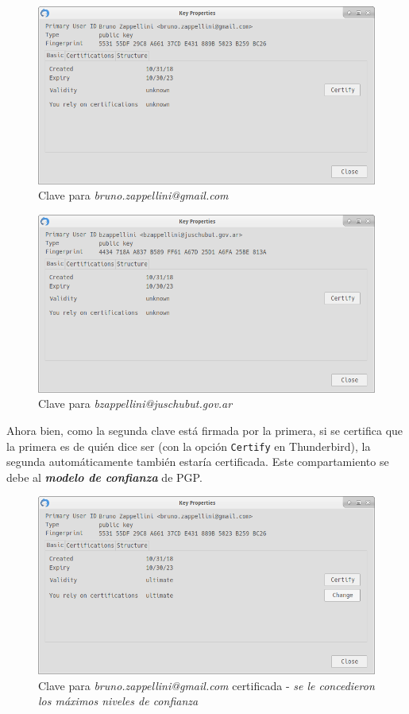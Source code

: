\begin{figure}[H]
    \centering
    \includegraphics[width=.8\linewidth]{images/arys-tp3-clave-pgp-gmail-zape.png}
    \caption*{Clave para \emph{bruno.zappellini@gmail.com}}
\end{figure}

\begin{figure}[H]
    \centering
    \includegraphics[width=.8\linewidth]{images/arys-tp3-clave-pgp-juschubut-zape.png}
    \caption*{Clave para \emph{bzappellini@juschubut.gov.ar}}
\end{figure}

Ahora bien, como la segunda clave está firmada por la primera, si se certifica que la primera es de quién dice ser (con la opción \texttt{Certify} en Thunderbird), la segunda automáticamente también estaría certificada. Este compartamiento se debe al \emph{\textbf{modelo de confianza}} de PGP.

\begin{figure}[H]
    \centering
    \includegraphics[width=0.8\linewidth]{images/arys-tp3-clave-pgp-gmail-zape-confiada.png}
    \caption*{Clave para \emph{bruno.zappellini@gmail.com} certificada - \emph{se le concedieron los máximos niveles de confianza}}
\end{figure}

